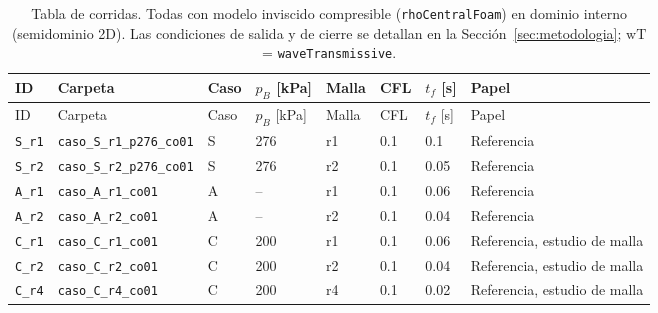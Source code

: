 \begin{longtable}{p{2.0cm}p{5.0cm}p{0.8cm}p{1.7cm}p{0.8cm}p{0.7cm}p{0.8cm}p{2.5cm}}
\caption{Tabla de corridas. Todas con modelo inviscido compresible (\texttt{rhoCentralFoam}) en dominio interno (semidominio 2D). Las condiciones de salida y de cierre se detallan en la Sección~\ref{sec:metodologia}; $\mathrm{wT}$ = \texttt{waveTransmissive}.}\label{tab:corridas-completa}\\
\toprule
ID & Carpeta & Caso & $p_B$ [kPa] & Malla & CFL & $t_f$ [s] & Papel \\
\midrule
\endfirsthead
\toprule ID & Carpeta & Caso & $p_B$ [kPa] & Malla & CFL & $t_f$ [s] & Papel \\ \midrule
\endhead
\bottomrule
\endfoot
\scriptsize \texttt{S\_\allowbreak r1} & \scriptsize \texttt{caso\_\allowbreak S\_\allowbreak r1\_\allowbreak p276\_\allowbreak co01} & \scriptsize S & \scriptsize 276 & \scriptsize r1 & \scriptsize 0.1 & \scriptsize 0.1 & \scriptsize Referencia \\
\scriptsize \texttt{S\_\allowbreak r2} & \scriptsize \texttt{caso\_\allowbreak S\_\allowbreak r2\_\allowbreak p276\_\allowbreak co01} & \scriptsize S & \scriptsize 276 & \scriptsize r2 & \scriptsize 0.1 & \scriptsize 0.05 & \scriptsize Referencia \\
\scriptsize \texttt{A\_\allowbreak r1} & \scriptsize \texttt{caso\_\allowbreak A\_\allowbreak r1\_\allowbreak co01} & \scriptsize A & \scriptsize -- & \scriptsize r1 & \scriptsize 0.1 & \scriptsize 0.06 & \scriptsize Referencia \\
\scriptsize \texttt{A\_\allowbreak r2} & \scriptsize \texttt{caso\_\allowbreak A\_\allowbreak r2\_\allowbreak co01} & \scriptsize A & \scriptsize -- & \scriptsize r2 & \scriptsize 0.1 & \scriptsize 0.04 & \scriptsize Referencia \\
\scriptsize \texttt{C\_\allowbreak r1} & \scriptsize \texttt{caso\_\allowbreak C\_\allowbreak r1\_\allowbreak co01} & \scriptsize C & \scriptsize 200 & \scriptsize r1 & \scriptsize 0.1 & \scriptsize 0.06 & \scriptsize Referencia, estudio de malla \\
\scriptsize \texttt{C\_\allowbreak r2} & \scriptsize \texttt{caso\_\allowbreak C\_\allowbreak r2\_\allowbreak co01} & \scriptsize C & \scriptsize 200 & \scriptsize r2 & \scriptsize 0.1 & \scriptsize 0.04 & \scriptsize Referencia, estudio de malla \\
\scriptsize \texttt{C\_\allowbreak r4} & \scriptsize \texttt{caso\_\allowbreak C\_\allowbreak r4\_\allowbreak co01} & \scriptsize C & \scriptsize 200 & \scriptsize r4 & \scriptsize 0.1 & \scriptsize 0.02 & \scriptsize Referencia, estudio de malla \\

\end{longtable}
